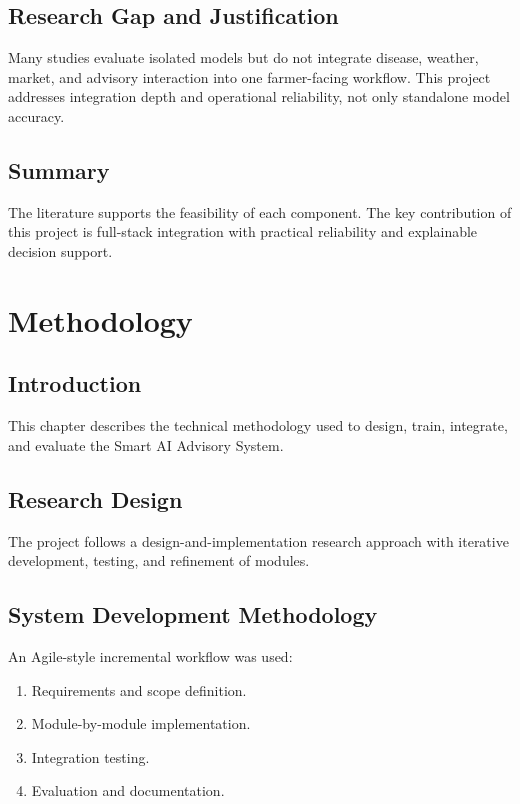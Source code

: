 \documentclass[12pt,a4paper]{report}
\begin{document}
\section{Research Gap and Justification}
Many studies evaluate isolated models but do not integrate disease, weather, market, and advisory interaction into one farmer-facing workflow. This project addresses integration depth and operational reliability, not only standalone model accuracy.

\section{Summary}
The literature supports the feasibility of each component. The key contribution of this project is full-stack integration with practical reliability and explainable decision support.

\chapter{Methodology}

\section{Introduction}
This chapter describes the technical methodology used to design, train, integrate, and evaluate the Smart AI Advisory System.

\section{Research Design}
The project follows a design-and-implementation research approach with iterative development, testing, and refinement of modules.

\section{System Development Methodology}
An Agile-style incremental workflow was used:
\begin{enumerate}[noitemsep]
    \item Requirements and scope definition.
    \item Module-by-module implementation.
    \item Integration testing.
    \item Evaluation and documentation.
\end{enumerate}
\end{document}
